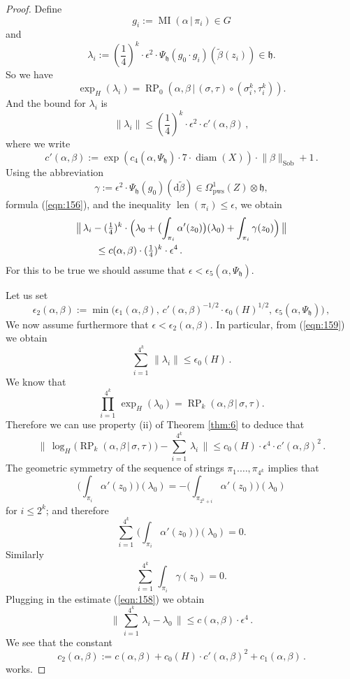 \documentclass[10pt, a4paper]{amsart}
\theoremstyle{definition}
\numberwithin{equation}{section}
\newcommand{\opn}{\operatorname}
\newcommand{\mfrak}[1]{\mathfrak{#1}}
\newcommand{\mrm}[1]{\mathrm{#1}}
\newcommand{\smfrac}[2]{{\textstyle \frac{#1}{#2}}}
\newcommand{\til}[1]{\tilde{#1}}
\newcommand{\norm}[1]{\lVert #1 \rVert}
\newcommand{\Norm}[1]{\bigl\lVert\, #1 \, \bigr\rVert}
\renewcommand{\vert}{\, | \,}
\newcommand{\h}{\mfrak{h}}
\renewcommand{\d}{\mrm{d}}
\begin{document}
\begin{proof}
Define
\[  g_i := \opn{MI}(\alpha \vert \pi_i) \in G  \]
and
\[ \lambda_i := (\smfrac{1}{4})^k \cdot \epsilon^2 \cdot
\Psi_{\h}(g_0 \cdot g_i)(\til{\beta}(z_i)) \in \h . \]
So we have
\[ \exp_H(\lambda_i) = 
\opn{RP}_0(\alpha, \beta \vert (\sigma, \tau) \circ (\sigma^k_i, \tau^k_i) ) .
\]
And the bound for $\lambda_i$ is 
\begin{equation} \label{eqn:159}
\norm{ \lambda_i } \leq (\smfrac{1}{4})^k \cdot \epsilon^2 \cdot 
c'(\alpha, \beta) \, ,
\end{equation}
where we write
\[ c'(\alpha, \beta) :=  \exp( c_4(\alpha, \Psi_{\h}) \cdot 
7 \cdot \opn{diam}(X) ) \cdot \norm{ \beta }_{\mrm{Sob}} + 1  \, . \]
Using the abbreviation
\[ \gamma := \epsilon^2 \cdot \Psi_{\h}(g_0)(\d \til{\beta}) \in 
\Omega^1_{\mrm{pws}}(Z) \otimes \h , \]
formula (\ref{eqn:156}), and the inequality
$\opn{len}(\pi_i) \leq \epsilon$, we obtain
\begin{equation} \label{eqn:158}
\begin{aligned}
& \Norm{ \lambda_i - (\smfrac{1}{4})^k \cdot 
\Bigl( \lambda_0 + \bigl( \int_{\pi_i} \alpha'(z_0) \bigl)
(\lambda_0) +  \int_{\pi_i} \gamma(z_0) \Bigr) } \\
& \qquad \leq 
c(\alpha, \beta) \cdot (\smfrac{1}{4})^k \cdot \epsilon^4 \, . 
\end{aligned} 
\end{equation}
For this to be true we should assume that 
$\epsilon < \epsilon_5(\alpha, \Psi_{\h})$.

Let us set
\[ \epsilon_2(\alpha, \beta) := 
\min \bigl( \epsilon_1(\alpha, \beta), \, 
c'(\alpha, \beta)^{- 1/2} \cdot \epsilon_0(H)^{1/2} , \,
\epsilon_5(\alpha, \Psi_{\h}) \bigl) \, , \]
We now assume furthermore that 
$\epsilon < \epsilon_2(\alpha, \beta)$.
In particular, from (\ref{eqn:159}) we obtain 
\[ \sum_{i = 1}^{4^k} \, \norm{ \lambda_i } \leq \epsilon_0(H) \, . \]
We know that
\[ \prod_{i = 1}^{4^k} \, \exp_H(\lambda_0) = 
\opn{RP}_k(\alpha, \beta \vert \sigma, \tau) . \]
Therefore we can use property (ii) of Theorem \ref{thm:6} to deduce that
\[ \Norm{ \log_H \bigl( \opn{RP}_k(\alpha, \beta \vert \sigma, \tau) \bigr) 
- \sum_{i = 1}^{4^k} \, \lambda_i } \leq
c_0(H) \cdot \epsilon^4 \cdot c'(\alpha, \beta)^2 \, . \]
The geometric symmetry of the sequence of strings $\pi_1. \ldots, \pi_{4^k}$
implies that
\[ \bigl( \int_{\pi_i} \alpha'(z_0) \bigl)(\lambda_0) = 
- \bigl( \int_{\pi_{2^k + i}} \alpha'(z_0) \bigl)(\lambda_0) \]
for $i \leq 2^k$; and therefore 
\[ \sum_{i = 1}^{4^k} \, \bigl( \int_{\pi_i} \alpha'(z_0) \bigl)(\lambda_0) 
= 0 . \]
Similarly 
\[ \sum_{i = 1}^{4^k} \, \int_{\pi_i} \gamma(z_0) = 0 . \]
Plugging in the estimate (\ref{eqn:158}) we obtain 
\[  \Norm{ \sum_{i = 1}^{4^k} \, \lambda_i - \lambda_0 } \leq 
c(\alpha, \beta) \cdot \epsilon^4 \, . \]
We see that the constant 
\[ c_2(\alpha, \beta) := c(\alpha, \beta) + 
c_0(H) \cdot c'(\alpha, \beta)^2 + c_1(\alpha, \beta) \, . \]
works.
\end{proof}
\end{document}
